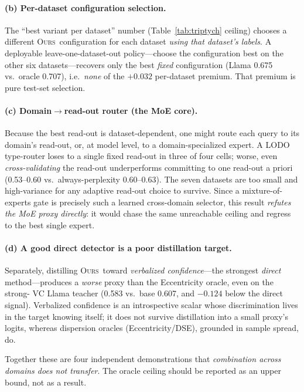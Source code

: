 \documentclass[11pt]{article}
\newcommand{\ours}{\textsc{Ours}}
\begin{document}
\paragraph{(b) Per-dataset configuration selection.} The ``best variant per dataset''
number (Table~\ref{tab:triptych} ceiling) chooses a different \ours\ configuration for
each dataset \emph{using that dataset's labels}. A deployable leave-one-dataset-out
policy---choose the configuration best on the other six datasets---recovers only the
best \emph{fixed} configuration (Llama 0.675 vs.\ oracle 0.707), i.e.\ \emph{none} of the
$+0.032$ per-dataset premium. That premium is pure test-set selection.

\paragraph{(c) Domain$\to$read-out router (the MoE core).} Because the best read-out is
dataset-dependent, one might route each query to its domain's read-out, or, at model
level, to a domain-specialized expert. A LODO type-router loses to a single fixed
read-out in three of four cells; worse, even \emph{cross-validating} the read-out
underperforms committing to one read-out a priori (0.53--0.60 vs.\ always-perplexity
0.60--0.63). The seven datasets are too small and high-variance for any adaptive
read-out choice to survive. Since a mixture-of-experts gate is precisely such a learned
cross-domain selector, this result \emph{refutes the MoE proxy directly}: it would chase
the same unreachable ceiling and regress to the best single expert.

\paragraph{(d) A good direct detector is a poor distillation target.} Separately,
distilling \ours\ toward \emph{verbalized confidence}---the strongest \emph{direct}
method---produces a \emph{worse} proxy than the Eccentricity oracle, even on the strong-
VC Llama teacher (0.583 vs.\ base 0.607, and $-0.124$ below the direct signal). Verbalized
confidence is an introspective scalar whose discrimination lives in the target knowing
itself; it does not survive distillation into a small proxy's logits, whereas
dispersion oracles (Eccentricity/DSE), grounded in sample spread, do.

Together these are four independent demonstrations that \emph{combination across
domains does not transfer}. The oracle ceiling should be reported as an upper bound, not
as a result.
\end{document}
